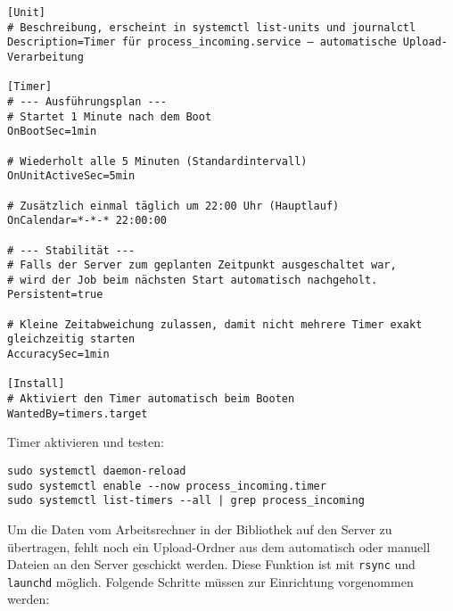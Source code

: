 \documentclass[12pt,a4paper]{report}
\begin{document}
\begin{enumerate}
\begin{verbatim}
[Unit]
# Beschreibung, erscheint in systemctl list-units und journalctl
Description=Timer für process_incoming.service – automatische Upload-Verarbeitung

[Timer]
# --- Ausführungsplan ---
# Startet 1 Minute nach dem Boot
OnBootSec=1min

# Wiederholt alle 5 Minuten (Standardintervall)
OnUnitActiveSec=5min

# Zusätzlich einmal täglich um 22:00 Uhr (Hauptlauf)
OnCalendar=*-*-* 22:00:00

# --- Stabilität ---
# Falls der Server zum geplanten Zeitpunkt ausgeschaltet war,
# wird der Job beim nächsten Start automatisch nachgeholt.
Persistent=true

# Kleine Zeitabweichung zulassen, damit nicht mehrere Timer exakt gleichzeitig starten
AccuracySec=1min

[Install]
# Aktiviert den Timer automatisch beim Booten
WantedBy=timers.target
    \end{verbatim}

    \noindent Timer aktivieren und testen:
    \begin{verbatim}
sudo systemctl daemon-reload
sudo systemctl enable --now process_incoming.timer
sudo systemctl list-timers --all | grep process_incoming
    \end{verbatim}
  \end{enumerate}

  Um die Daten vom Arbeitsrechner in der Bibliothek auf den Server zu übertragen,
  fehlt noch ein Upload-Ordner aus dem automatisch oder manuell Dateien an den Server geschickt werden.
  Diese Funktion ist mit \texttt{rsync} und \texttt{launchd} möglich. 
  Folgende Schritte müssen zur Einrichtung vorgenommen werden:
\end{document}
